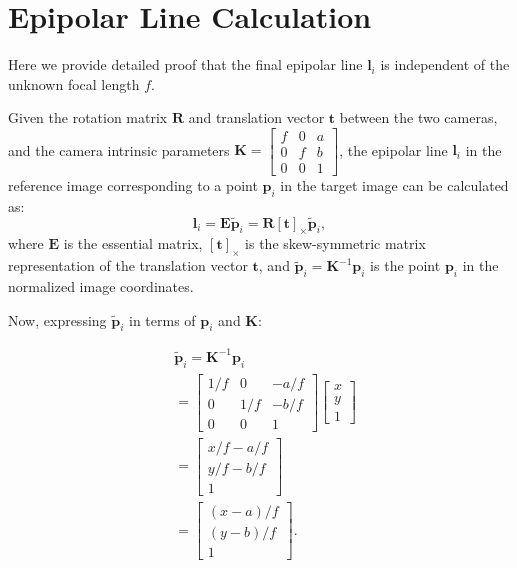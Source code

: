 \clearpage
\setcounter{page}{1}
\maketitlesupplementary
\appendix
{}

\section{Epipolar Line Calculation}
\label{sec:epipolar}

Here we provide detailed proof that the final epipolar line  $\boldsymbol{l}_i$ is independent of the unknown focal length $f$.

Given the rotation matrix $\mathbf{R}$ and translation vector $\boldsymbol{t}$ between the two cameras, and the camera intrinsic parameters $\mathbf{K} = \begin{bmatrix} f & 0 & a \\ 0 & f & b \\ 0 & 0 & 1 \end{bmatrix}$, the epipolar line $\mathbf{l}_i$ in the reference image corresponding to a point $\boldsymbol{p}_i$ in the target image can be calculated as:
\begin{equation}
    \boldsymbol{l}_i = \mathbf{E} \tilde{\boldsymbol{p}}_i = \mathbf{R} [\boldsymbol{t}]_{\times} \tilde{\boldsymbol{p}}_i,
\end{equation}
where $\mathbf{E}$ is the essential matrix, $[\boldsymbol{t}]_{\times}$ is the skew-symmetric matrix representation of the translation vector $\boldsymbol{t}$, and $\tilde{\boldsymbol{p}}_i = \mathbf{K}^{-1} \boldsymbol{p}_i$ is the point $\boldsymbol{p}_i$ in the normalized image coordinates.

Now, expressing $\tilde{\boldsymbol{p}}_i$ in terms of \(\boldsymbol{p}_i\) and \(\mathbf{K}\):

\begin{equation}
    \begin{aligned}
        & \tilde{\boldsymbol{p}}_i=\mathbf{K}^{-1} \boldsymbol{p}_i \\
        & =\left[\begin{array}{ccc}
        1 / f & 0 & -a / f \\
        0 & 1 / f & -b / f \\
        0 & 0 & 1
        \end{array}\right]\left[\begin{array}{l}
        x \\
        y \\
        1
        \end{array}\right] \\
        & =\left[\begin{array}{c}
        x / f-a / f \\
        y / f-b / f \\
        1
        \end{array}\right] \\
        & =\left[\begin{array}{c}
        (x-a) / f \\
        (y-b) / f \\
        1
        \end{array}\right].
    \end{aligned}
\end{equation}

